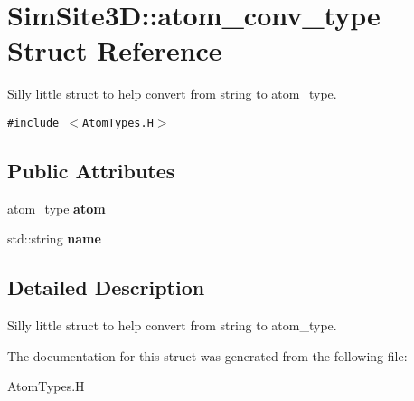 \section{SimSite3D::atom\_\-conv\_\-type Struct Reference}
\label{structSimSite3D_1_1atom__conv__type}
Silly little struct to help convert from string to atom\_\-type.  


{\tt \#include $<$Atom\-Types.H$>$}

\subsection*{Public Attributes}
\begin{CompactItemize}
\item 
atom\_\-type \textbf{atom}\label{structSimSite3D_1_1atom__conv__type_a815b2f900fc36004e1cfa6abae799e2}

\item 
std::string \textbf{name}\label{structSimSite3D_1_1atom__conv__type_92e7ee024a311135ac0e9121d6b50eab}

\end{CompactItemize}


\subsection{Detailed Description}
Silly little struct to help convert from string to atom\_\-type. 



The documentation for this struct was generated from the following file:\begin{CompactItemize}
\item 
Atom\-Types.H\end{CompactItemize}
